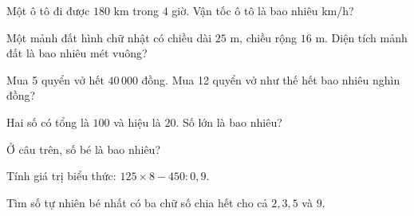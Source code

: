 \begin{ex}
  Một ô tô đi được $180\text{ km}$ trong $4$ giờ. Vận tốc ô tô là bao nhiêu km/h?
\end{ex}

\begin{ex}
  Một mảnh đất hình chữ nhật có chiều dài $25\text{ m}$, chiều rộng $16\text{ m}$. Diện tích mảnh đất là bao nhiêu mét vuông?
\end{ex}

\begin{ex}
  Mua 5 quyển vở hết $40\,000$ đồng. Mua 12 quyển vở như thế hết bao nhiêu nghìn đồng?
\end{ex}

\begin{ex}
  Hai số có tổng là $100$ và hiệu là $20$. Số lớn là bao nhiêu?
\end{ex}

\begin{ex}
  Ở câu trên, số bé là bao nhiêu?
\end{ex}

\begin{ex}
  Tính giá trị biểu thức: $125 \times 8 - 450 : 0{,}9$.
\end{ex}

\begin{ex}
  Tìm số tự nhiên bé nhất có ba chữ số chia hết cho cả $2, 3, 5$ và $9$.
\end{ex}
